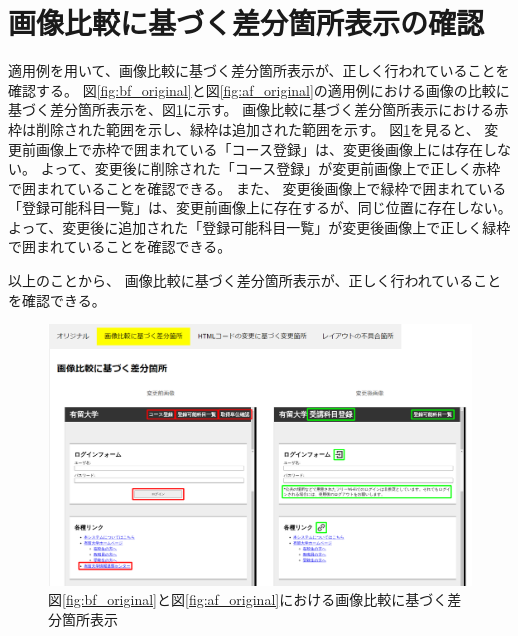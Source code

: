 \section{画像比較に基づく差分箇所表示の確認}
適用例を用いて、画像比較に基づく差分箇所表示が、正しく行われていることを確認する。
図\ref{fig:bf_original}と図\ref{fig:af_original}の適用例における画像の比較に基づく差分箇所表示を、図\ref{fig: 5_app2}に示す。
画像比較に基づく差分箇所表示における赤枠は削除された範囲を示し、緑枠は追加された範囲を示す。
図\ref{fig: 5_app2}を見ると、
変更前画像上で赤枠で囲まれている「コース登録」は、変更後画像上には存在しない。
よって、変更後に削除された「コース登録」が変更前画像上で正しく赤枠で囲まれていることを確認できる。
また、
変更後画像上で緑枠で囲まれている「登録可能科目一覧」は、変更前画像上に存在するが、同じ位置に存在しない。
よって、変更後に追加された「登録可能科目一覧」が変更後画像上で正しく緑枠で囲まれていることを確認できる。
\par
以上のことから、
画像比較に基づく差分箇所表示が、正しく行われていることを確認できる。
\begin{figure}[tp]
    \begin{center}
        \includegraphics[width=1.0\columnwidth]{image/5/new_img.png}
        \caption{図\ref{fig:bf_original}と図\ref{fig:af_original}における画像比較に基づく差分箇所表示}
        \label{fig: 5_app2}
    \end{center}
\end{figure}

